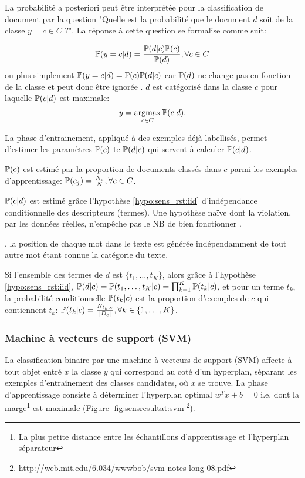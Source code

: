 La probabilité a posteriori peut être interprétée pour la classification de document par la question "Quelle est la probabilité que le document $d$ soit de la classe $y=c \in C$ ?". La réponse à cette question se formalise comme suit:

\[\mathbb{P}(y=c \vert d) = \frac{\mathbb{P}(d \vert c)\mathbb{P}(c)}{\mathbb{P}(d)}, \forall c \in C \]
ou plus simplement  $\mathbb{P}(y = c \vert d) = \mathbb{P}(c)\mathbb{P}(d \vert c)$ car $\mathbb{P}(d)$ ne change pas en fonction de la classe et peut donc être ignorée \citep{rish2001nb_study}. $d$ est catégorisé dans la classe $c$ pour laquelle $\mathbb{P}(c \vert d)$ est maximale: \[y = \mathop{\mathrm{argmax}}\limits_{c \in C} \mathbb{P}(c \vert d).\]

 La phase d'entrainement, appliqué à des exemples déjà labellisés, permet d'estimer les paramètres $\mathbb{P}(c)$ te $\mathbb{P}(d \vert c)$ qui servent à calculer $\mathbb{P}(c \vert d)$.

$\mathbb{P}(c)$ est estimé par la proportion de documents classés dans $c$ parmi les exemples d'apprentissage: $\mathbb{P}(c_j) = \frac{N_c}{N}, \forall c \in C$.


 $\mathbb{P}(c \vert d)$ est estimé grâce l'hypothèse \ref{hypo:sens_rst:iid} d'{indépendance conditionnelle des descripteurs (termes)}. Une hypothèse naïve dont la violation, par les données réelles, n'empêche pas le NB de bien fonctionner \citep{rish2001nb_study}. 

\begin{hypothese}, la position de chaque mot dans le texte est générée indépendamment de tout autre mot étant connue la catégorie du texte. \label{hypo:sens_rst:iid}
\end{hypothese}

Si l'ensemble des termes de $d$ est $\lbrace t_{1}, \dots, t_{K} \rbrace$, alors grâce à l'hypothèse \ref{hypo:sens_rst:iid},
$\mathbb{P}(d \vert c) = \mathbb{P}(t_{1}, \dots, t_{K}\vert c) = \prod_{k=1}^K \mathbb{P}(t_{k} \vert c)$, et pour un terme $t_k$, la probabilité conditionnelle $\mathbb{P}(t_k \vert c)$ est la proportion d'exemples de $c$ qui contiennent $t_k$:  $\mathbb{P}(t_k \vert c) = \frac{N_{t_k,c}}{\vert D_c \vert }, \forall k \in \lbrace 1, \dots, K \rbrace$.

\subsubsection{Machine à vecteurs de support (SVM)}
\label{sec:sens-resultat:svm}
La classification binaire par une machine à vecteurs de support (SVM) \citep{vapnik1995statlearning} affecte à tout objet entré $x$ la classe $y$ qui correspond au coté d'un hyperplan, séparant les exemples d'entraînement des classes candidates, où $x$ se trouve. La phase d'apprentissage consiste à déterminer l'hyperplan optimal $w^T x + b = 0$ i.e. dont la marge\footnote{La plus petite distance entre les échantillons d'apprentissage et l'hyperplan séparateur} est maximale (Figure \ref{fig:sensresultat:svm}\footnote{\url{http://web.mit.edu/6.034/wwwbob/svm-notes-long-08.pdf}}).

